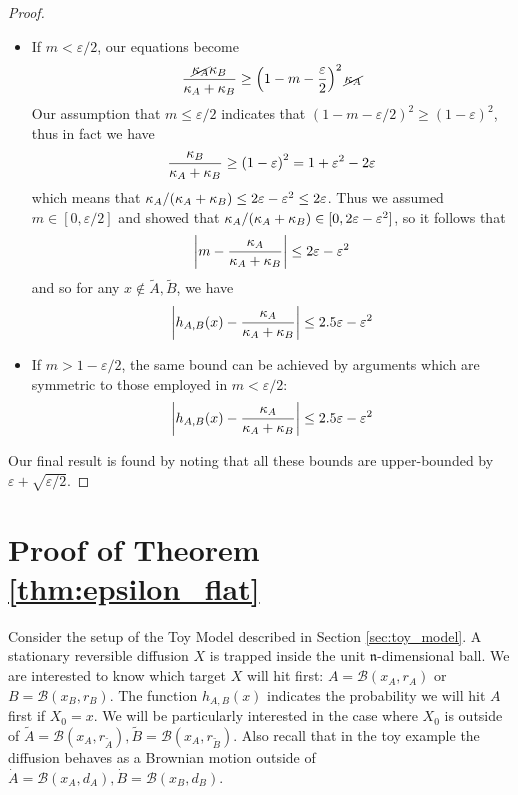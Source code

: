 \documentclass[english, aip, jcp, priprint, graphicx,floatfix]{revtex4-1}
\theoremstyle{plain}
\theoremstyle{definition}
\theoremstyle{plain}
\newcommand{\dimension}{{\mathfrak{n}}}
\newcommand{\bb}[1]{\mathcal{B}\left(#1\right)}
\begin{document}
\begin{proof}
\begin{itemize}
    \item If $m<\varepsilon/2$, our equations become 
    \[
    \frac{\cancel{\kappa_A} \kappa_B}{\kappa_A +\kappa_B}
    \geq
    \left( 1-m- \frac{\varepsilon}{2} \right)^2 \cancel{\kappa_A} 
    \]
    Our assumption that $m \leq \varepsilon/2$ indicates that $(1- m- \varepsilon/2)^2 \geq (1-\varepsilon)^2$, thus in fact we have 
    \[
    \frac{\kappa_B}{\kappa_A +\kappa_B}
    \geq
    \left( 1- \varepsilon \right)^2  = 1 + \varepsilon^2 - 2\varepsilon
    \]
    which means that $\kappa_A/(\kappa_A +\kappa_B)
    \leq
    2\varepsilon - \varepsilon^2 \leq 2\varepsilon$.  
    Thus we assumed $m\in[0,\varepsilon/2]$ and showed that $\kappa_A/(\kappa_A+\kappa_B)\in[0,2\varepsilon-\varepsilon^2]$, so it follows that 
    \[
    \left|m -  \frac{\kappa_A}{\kappa_A + \kappa_B}\right| \leq 2\varepsilon -\varepsilon^2
    \]
    and so for any $x\notin \tilde A,\tilde B$, we have 
    \[
    \left|h_{A,B}(x) -  \frac{\kappa_A}{\kappa_A + \kappa_B}\right| \leq 2.5\varepsilon -\varepsilon^2
    \]
    
    \item If $m>1-\varepsilon/2$, the same bound can be achieved by arguments which are symmetric to those employed in $m<\varepsilon/2$:
    \[
    \left|h_{A,B}(x) -  \frac{\kappa_A}{\kappa_A + \kappa_B}\right| \leq 2.5\varepsilon -\varepsilon^2
    \]
\end{itemize}
Our final result is found by noting that all these bounds are upper-bounded by $\varepsilon + \sqrt{\varepsilon/2}$.
\end{proof}

           

\section{Proof of Theorem \ref{thm:epsilon_flat}}\label{sec:proof_epsilon_flat}

Consider the setup of the Toy Model described in Section \ref{sec:toy_model}.  A stationary reversible diffusion $X$ is trapped inside the unit $\dimension$-dimensional ball.  We are interested to know which target $X$ will hit first: $A=\bb{x_A,r_A}$ or $B=\bb{x_B,r_B}$.  The function $h_{A,B}(x)$ indicates the probability we will hit $A$ first if $X_0=x$.  We will be particularly interested in the case where $X_0$ is outside of $\tilde A=\bb{x_A,r_{\tilde A}},\tilde B=\bb{x_A,r_{\tilde B}}$.  Also recall that in the toy example the diffusion behaves as a Brownian motion outside of $\dot A=\bb{x_A,d_A},\dot B=\bb{x_B,d_B}$.  
\end{document}
